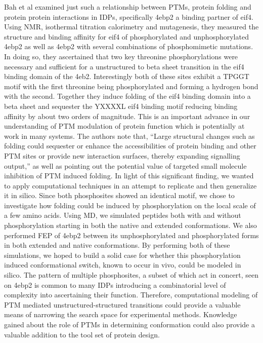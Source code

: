 Bah et al examined just such a relationship between PTMs, protein folding and protein protein interactions in IDPs, specifically 4ebp2 a binding partner of eif4.
Using NMR, isothermal titration calorimetry and mutagenesis, they measured the structure and binding affinity for eif4 of phosphorylated and unphosphorylated 4ebp2 as well as 4ebp2 with several combinations of phosphomimetic mutations.
In doing so, they ascertained that two key threonine phosphorylations were necessary and sufficient for a unstructured to beta sheet transition in the eif4 binding domain of the 4eb2.
Interestingly both of these sites exhibit a TPGGT motif with the first threonine being phosphorylated and forming a hydrogen bond with the second.
Together they induce folding of the eif4 binding domain into a beta sheet and sequester the YXXXXL eif4 binding motif reducing binding affinity by about two orders of magnitude.
This is an important advance in our understanding of PTM modulation of protein function which is potentially at work in many systems.
The authors note that, “Large structural changes such as folding could sequester or enhance the accessibilities of protein binding and other PTM sites or provide new interaction surfaces, thereby expanding signalling output,” as well as pointing out the potential value of targeted small molecule inhibition of PTM induced folding.  In light of this significant finding, we wanted to apply computational techniques in an attempt to replicate and then generalize it in silico. Since both phosphosites showed an identical motif, we chose to investigate how folding could be induced by phosphorylation on the local scale of a few amino acids.   Using MD, we simulated peptides both with and without phosphorylation starting in both the native and extended conformations.  We also performed FEP of 4ebp2 between its unphosphorylated and phosphorylated forms in both extended and native conformations.  By performing both of these simulations, we hoped to build a solid case for whether this phosphorylation induced conformational switch, known to occur in vivo, could be modeled in silico.  The pattern of multiple phosphosites, a subset of which act in concert, seen on 4ebp2 is common to many IDPs introducing a combinatorial level of complexity into ascertaining their function. Therefore, computational modeling of PTM mediated unstructured-structured transitions could provide a valuable means of narrowing the search space for experimental methods.  Knowledge gained about the role of PTMs in determining conformation could also provide a valuable addition to the tool set of protein design.

